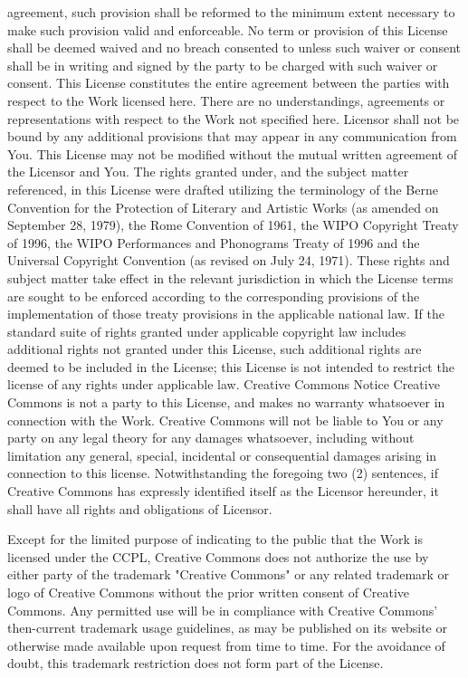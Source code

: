 \documentclass[oneside]{book}
\begin{document}
agreement, such provision shall be reformed to the minimum extent necessary to
make such provision valid and enforceable.  No term or provision of this License
shall be deemed waived and no breach consented to unless such waiver or consent
shall be in writing and signed by the party to be charged with such waiver or
consent.  This License constitutes the entire agreement between the parties with
respect to the Work licensed here. There are no understandings, agreements or
representations with respect to the Work not specified here. Licensor shall not
be bound by any additional provisions that may appear in any communication from
You. This License may not be modified without the mutual written agreement of
the Licensor and You.  The rights granted under, and the subject matter
referenced, in this License were drafted utilizing the terminology of the Berne
Convention for the Protection of Literary and Artistic Works (as amended on
September 28, 1979), the Rome Convention of 1961, the WIPO Copyright Treaty of
1996, the WIPO Performances and Phonograms Treaty of 1996 and the Universal
Copyright Convention (as revised on July 24, 1971). These rights and subject
matter take effect in the relevant jurisdiction in which the License terms are
sought to be enforced according to the corresponding provisions of the
implementation of those treaty provisions in the applicable national law. If the
standard suite of rights granted under applicable copyright law includes
additional rights not granted under this License, such additional rights are
deemed to be included in the License; this License is not intended to restrict
the license of any rights under applicable law.  Creative Commons Notice
Creative Commons is not a party to this License, and makes no warranty
whatsoever in connection with the Work. Creative Commons will not be liable to
You or any party on any legal theory for any damages whatsoever, including
without limitation any general, special, incidental or consequential damages
arising in connection to this license. Notwithstanding the foregoing two (2)
sentences, if Creative Commons has expressly identified itself as the Licensor
hereunder, it shall have all rights and obligations of Licensor.

Except for the limited purpose of indicating to the public that the Work is
licensed under the CCPL, Creative Commons does not authorize the use by either
party of the trademark "Creative Commons" or any related trademark or logo of
Creative Commons without the prior written consent of Creative Commons. Any
permitted use will be in compliance with Creative Commons' then-current
trademark usage guidelines, as may be published on its website or otherwise made
available upon request from time to time. For the avoidance of doubt, this
trademark restriction does not form part of the License.
\end{document}
